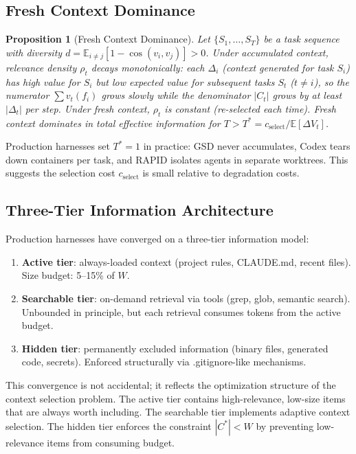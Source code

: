 \documentclass[11pt, a4paper, logo, copyright]{googledeepmind}
\newtheorem{proposition}{Proposition}[section]
\begin{document}
\subsection{Fresh Context Dominance}

\begin{proposition}[Fresh Context Dominance]
\label{prop:fresh-context}
Let $\{S_1, \ldots, S_T\}$ be a task sequence with diversity $d = \mathbb{E}_{i \neq j}[1 - \cos(v_i, v_j)] > 0$. Under accumulated context, relevance density $\rho_t$ decays monotonically: each $\Delta_i$ (context generated for task $S_i$) has high value for $S_i$ but low expected value for subsequent tasks $S_t$ ($t \neq i$), so the numerator $\sum v_t(f_i)$ grows slowly while the denominator $|C_t|$ grows by at least $|\Delta_t|$ per step. Under fresh context, $\rho_t$ is constant (re-selected each time). Fresh context dominates in total effective information for $T > T^* = c_{\text{select}} / \mathbb{E}[\Delta V_t]$.
\end{proposition}

Production harnesses set $T^* = 1$ in practice: GSD never accumulates, Codex tears down containers per task, and RAPID isolates agents in separate worktrees. This suggests the selection cost $c_{\text{select}}$ is small relative to degradation costs.

\subsection{Three-Tier Information Architecture}

Production harnesses have converged on a three-tier information model:

\begin{enumerate}
    \item \textbf{Active tier}: always-loaded context (project rules, CLAUDE.md, recent files). Size budget: 5--15\% of $W$.
    \item \textbf{Searchable tier}: on-demand retrieval via tools (grep, glob, semantic search). Unbounded in principle, but each retrieval consumes tokens from the active budget.
    \item \textbf{Hidden tier}: permanently excluded information (binary files, generated code, secrets). Enforced structurally via .gitignore-like mechanisms.
\end{enumerate}

This convergence is not accidental; it reflects the optimization structure of the context selection problem. The active tier contains high-relevance, low-size items that are always worth including. The searchable tier implements adaptive context selection. The hidden tier enforces the constraint $|C^*| < W$ by preventing low-relevance items from consuming budget.
\end{document}
